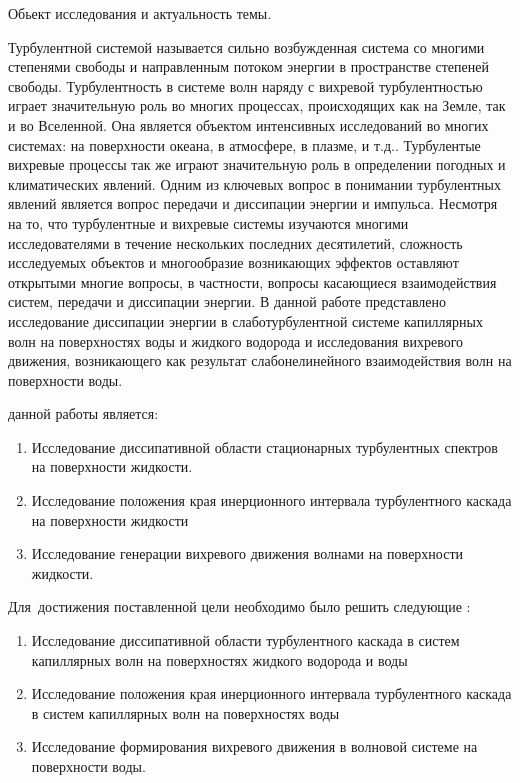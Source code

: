 
{\actuality}Обьект исследования и актуальность темы.

Турбулентной системой называется сильно возбужденная система со многими степенями свободы и направленным потоком энергии в пространстве степеней свободы. Турбулентность в системе волн наряду с вихревой турбулентностью играет значительную роль во многих процессах, происходящих как на Земле, так и во Вселенной. Она является объектом  интенсивных исследований во многих системах: на поверхности океана, в атмосфере, в плазме, и т.д.. Турбулентые вихревые процессы так же играют значительную роль в определении погодных и климатических явлений. Одним из ключевых вопрос в понимании турбулентных явлений является вопрос передачи и диссипации энергии и импульса. 
Несмотря на то, что турбулентные и вихревые системы изучаются многими исследователями в течение нескольких последних десятилетий, сложность исследуемых объектов и многообразие возникающих эффектов оставляют открытыми многие вопросы, в частности, вопросы касающиеся взаимодействия систем, передачи и диссипации энергии. 
В данной работе представлено исследование диссипации энергии в слаботурбулентной системе капиллярных волн на поверхностях воды и жидкого водорода и исследования вихревого движения, возникающего как результат слабонелинейного взаимодействия волн на поверхности воды.

{\aim} данной работы является: 
\begin{enumerate}
	\item Исследование диссипативной области стационарных турбулентных спектров на поверхности жидкости.
	\item Исследование положения края инерционного интервала турбулентного каскада на поверхности жидкости
	\item Исследование генерации вихревого движения волнами на поверхности жидкости.
\end{enumerate}

Для~достижения поставленной цели необходимо было решить следующие {\tasks}:
\begin{enumerate}
	\item Исследование диссипативной области турбулентного каскада в систем капиллярных волн на поверхностях жидкого водорода и воды
	\item Исследование положения края инерционного интервала турбулентного каскада в систем капиллярных волн на поверхностях воды
	\item Исследование формирования вихревого движения в волновой системе на поверхности воды.
\end{enumerate}

